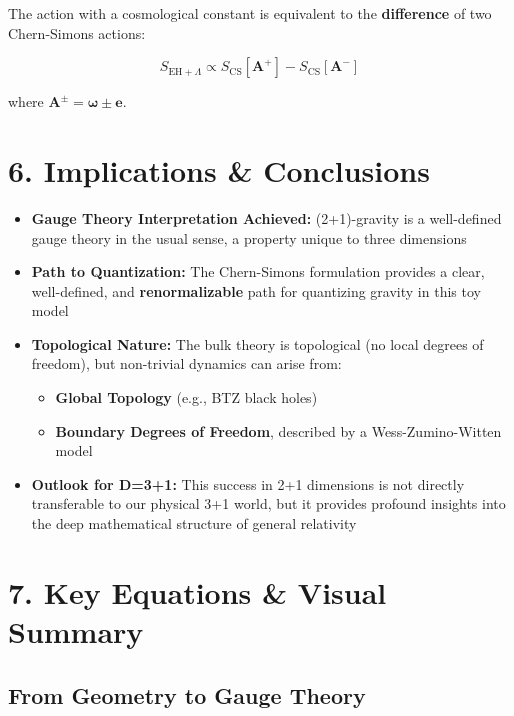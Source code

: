 \documentclass[a0,portrait]{a0poster}
\begin{document}
\begin{multicols}{2}
The action with a cosmological constant is equivalent to the \textbf{difference} of two Chern-Simons actions:

\begin{equation*}
    S_{\text{EH}+\Lambda} \propto S_{\text{CS}}[\mathbf{A}^+] - S_{\text{CS}}[\mathbf{A}^-]
\end{equation*}

where $\mathbf{A}^\pm = \boldsymbol{\omega} \pm \mathbf{e}$.

\section*{6. Implications \& Conclusions}

\begin{itemize}
    \item \textbf{Gauge Theory Interpretation Achieved:} (2+1)-gravity is a well-defined gauge theory in the usual sense, a property unique to three dimensions
    \item \textbf{Path to Quantization:} The Chern-Simons formulation provides a clear, well-defined, and \textbf{renormalizable} path for quantizing gravity in this toy model
    \item \textbf{Topological Nature:} The bulk theory is topological (no local degrees of freedom), but non-trivial dynamics can arise from:
    \begin{itemize}
        \item \textbf{Global Topology} (e.g., BTZ black holes)
        \item \textbf{Boundary Degrees of Freedom}, described by a Wess-Zumino-Witten model
    \end{itemize}
    \item \textbf{Outlook for D=3+1:} This success in 2+1 dimensions is not directly transferable to our physical 3+1 world, but it provides profound insights into the deep mathematical structure of general relativity
\end{itemize}

\section*{7. Key Equations \& Visual Summary}

\subsection*{From Geometry to Gauge Theory}


\end{multicols}
\end{document}
